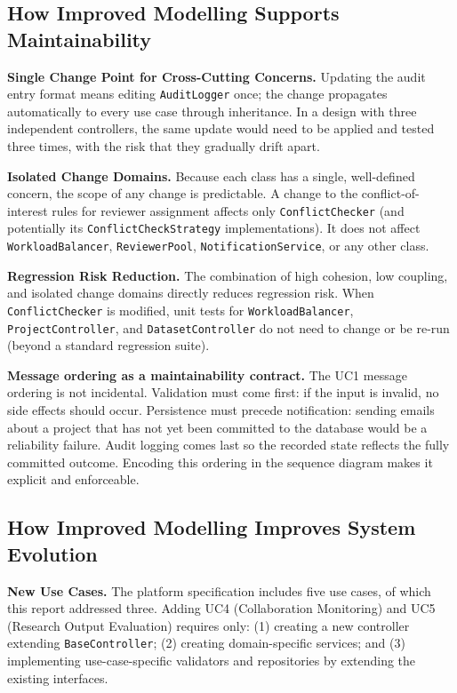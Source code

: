 \documentclass[12pt,a4paper]{article}
\newcommand{\code}[1]{\texttt{\small #1}}
\begin{document}
\subsection{How Improved Modelling Supports Maintainability}

\noindent\textbf{Single Change Point for Cross-Cutting Concerns.}
Updating the audit entry format means editing \code{AuditLogger} once; the change propagates automatically to every use case through inheritance. In a design with three independent controllers, the same update would need to be applied and tested three times, with the risk that they gradually drift apart.

\noindent\textbf{Isolated Change Domains.}
Because each class has a single, well-defined concern, the scope of any change is predictable. A change to the conflict-of-interest rules for reviewer assignment affects only \code{ConflictChecker} (and potentially its \code{ConflictCheckStrategy} implementations). It does not affect \code{WorkloadBalancer}, \code{ReviewerPool}, \code{NotificationService}, or any other class.

\noindent\textbf{Regression Risk Reduction.}
The combination of high cohesion, low coupling, and isolated change domains directly reduces regression risk. When \code{ConflictChecker} is modified, unit tests for \code{WorkloadBalancer}, \code{ProjectController}, and \code{DatasetController} do not need to change or be re-run (beyond a standard regression suite).

\noindent\textbf{Message ordering as a maintainability contract.}
The UC1 message ordering is not incidental. Validation must come first: if the input is invalid, no side effects should occur. Persistence must precede notification: sending emails about a project that has not yet been committed to the database would be a reliability failure. Audit logging comes last so the recorded state reflects the fully committed outcome. Encoding this ordering in the sequence diagram makes it explicit and enforceable.

\subsection{How Improved Modelling Improves System Evolution}

\noindent\textbf{New Use Cases.}
The platform specification includes five use cases, of which this report addressed three. Adding UC4 (Collaboration Monitoring) and UC5 (Research Output Evaluation) requires only: (1) creating a new controller extending \code{BaseController}; (2) creating domain-specific services; and (3) implementing use-case-specific validators and repositories by extending the existing interfaces.
\end{document}
